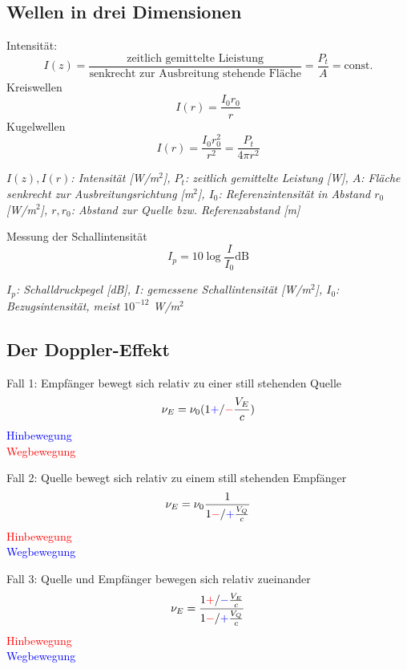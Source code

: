 \documentclass[a5paper,10pt]{article}
\newenvironment{displayformula}
{
	\begin{framed}
		\color{formulaColor}
	}
	{\end{framed}}
\newcommand{\formulalegend}[1]{%
	\par\vspace{0.5ex}%
	{{\color{legendColor}\RaggedRight\small\textit{#1}}}%
	\par\vspace{1.5ex}%
}
\begin{document}
\subsection{Wellen in drei Dimensionen}
\begin{displayformula}
	Intensität:
	\[
	I(z) = \frac{\text{zeitlich gemittelte Lieistung}}{\text{senkrecht zur Ausbreitung stehende Fläche}} = \frac{P_t}{A} = \text{const.}
	\]
	Kreiswellen
	\[
	I(r) = \frac{I_0r_0}{r}
	\]
	Kugelwellen
	\[
	I(r) = \frac{I_0r_0^2}{r^2} = \frac{P_t}{4\pi r^2}
	\]
\end{displayformula}
\formulalegend{
	\( I(z), I(r) \): Intensität [W/m\(^2\)], 
	\( P_t \): zeitlich gemittelte Leistung [W], 
	\( A \): Fläche senkrecht zur Ausbreitungsrichtung [m\(^2\)], 
	\( I_0 \): Referenzintensität in Abstand \( r_0 \) [W/m\(^2\)], 
	\( r, r_0 \): Abstand zur Quelle bzw. Referenzabstand [m]
}

\begin{displayformula}
	Messung der Schallintensität
	\[
	I_p = 10\log \frac{I}{I_0} \text{dB}
	\]
\end{displayformula}
\formulalegend{
	$I_p$: Schalldruckpegel [dB], 
	$I$: gemessene Schallintensität [W/m$^2$], 
	$I_0$: Bezugsintensität, meist $10^{-12}$ W/m$^2$
}

\newpage

\subsection{Der Doppler-Effekt}

\begin{displayformula}
	Fall 1: Empfänger bewegt sich relativ zu einer still stehenden Quelle
	\[
	\nu_E = \nu_0 (1 \textcolor{blue}{+} / \textcolor{red}{-} \frac{V_E}{c})
	\]
	\textcolor{blue}{Hinbewegung} \\
	\textcolor{red}{Wegbewegung}
\end{displayformula}

\begin{displayformula}
	Fall 2: Quelle bewegt sich relativ zu einem still stehenden Empfänger
	\[
	\nu_E = \nu_0 \frac{1}{1 \textcolor{red}{-} / \textcolor{blue}{+} \frac{V_Q}{c}}
	\]
	\textcolor{red}{Hinbewegung} \\
	\textcolor{blue}{Wegbewegung}
\end{displayformula}

\begin{displayformula}
	Fall 3: Quelle und Empfänger bewegen sich relativ zueinander
	\[
	\nu_E = \frac{1 \textcolor{red}{+} / \textcolor{blue}{-} \frac{V_E}{c}}{1 \textcolor{red}{-} / \textcolor{blue}{+} \frac{V_Q}{c}}
	\]
	\textcolor{red}{Hinbewegung} \\
	\textcolor{blue}{Wegbewegung}
\end{displayformula}
\end{document}
